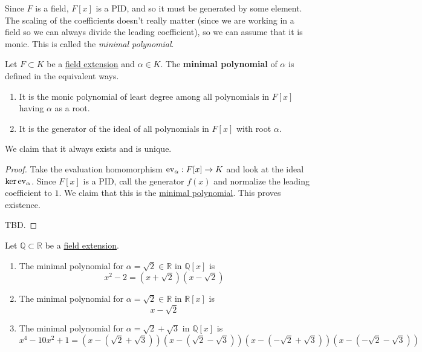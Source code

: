   Since $F$ is a field, $F[x]$ is a PID, and so it must be generated by some element. The scaling of the coefficients doesn't really matter (since we are working in a field so we can always divide the leading coefficient), so we can assume that it is monic. This is called the \textit{minimal polynomial}. 

  \begin{definition}
    \label{def:min_poly}
    Let $F \subset K$ be a \hyperref[def:field-extension]{field extension} and $\alpha \in K$. The \textbf{minimal polynomial} of $\alpha$ is defined in the equivalent ways. 
    \begin{enumerate}
      \item It is the monic polynomial of least degree among all polynomials in $F[x]$ having $\alpha$ as a root. 
      \item It is the generator of the ideal of all polynomials in $F[x]$ with root $\alpha$. 
    \end{enumerate}
    We claim that it always exists and is unique. 
  \end{definition} 
  \begin{proof}
    Take the evaluation homomorphism $\operatorname{ev}_\alpha: F[x] \to K$ and look at the ideal $\ker{\operatorname{ev}_\alpha}$. Since $F[x]$ is a PID, call the generator $f(x)$ and normalize the leading coefficient to $1$. We claim that this is the \hyperref[def:min_poly]{minimal polynomial}. This proves existence. 

    TBD. 
  \end{proof}

  \begin{example}
    \label{ex:minimal-polynomials}
    Let $\mathbb{Q} \subset \mathbb{R}$ be a \hyperref[def:field-extension]{field extension}. 
    \begin{enumerate}
      \item The minimal polynomial for $\alpha = \sqrt{2} \in \mathbb{R}$ in $\mathbb{Q}[x]$ is 
      \begin{equation}
        x^2 - 2 = (x + \sqrt{2}) (x - \sqrt{2})
      \end{equation}

      \item The minimal polynomial for $\alpha = \sqrt{2} \in \mathbb{R}$ in $\mathbb{R}[x]$ is 
      \begin{equation}
        x - \sqrt{2}
      \end{equation}

      \item The minimal polynomial for $\alpha = \sqrt{2} + \sqrt{3}$ in $\mathbb{Q}[x]$ is 
      \begin{equation}
        x^4 - 10x^2 + 1 = (x - (\sqrt{2} + \sqrt{3}))(x - (\sqrt{2} - \sqrt{3}))(x - (-\sqrt{2} + \sqrt{3}))(x - (-\sqrt{2} - \sqrt{3}))
      \end{equation}
    \end{enumerate}
  \end{example}

